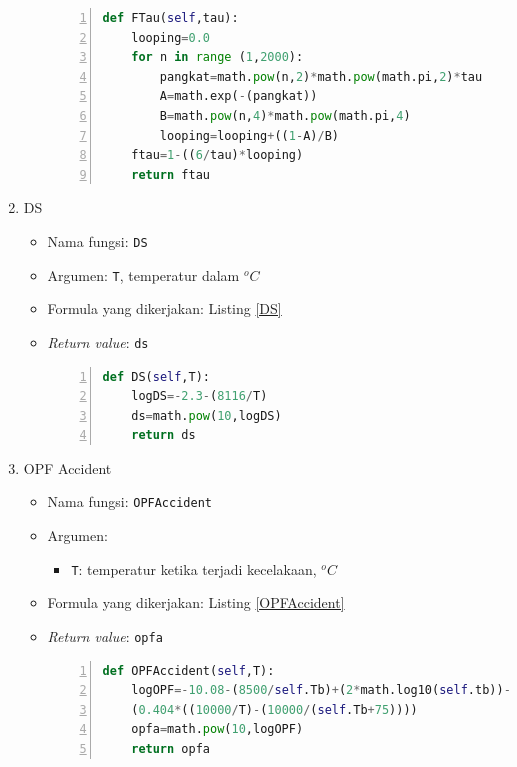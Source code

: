 \documentclass[a4paper,11pt]{report}
\begin{document}
\begin{enumerate}
\begin{itemize}
\scriptsize
\begin{lstlisting}[language=python, numbers=left, numberstyle=\tiny, caption=Fungsi FTau, showstringspaces=false, label=FTau]    
def FTau(self,tau):
	looping=0.0
	for n in range (1,2000):
		pangkat=math.pow(n,2)*math.pow(math.pi,2)*tau
		A=math.exp(-(pangkat))
		B=math.pow(n,4)*math.pow(math.pi,4)
		looping=looping+((1-A)/B)			
	ftau=1-((6/tau)*looping)
	return ftau
\end{lstlisting}
\normalsize
    
  \end{itemize}
  \item DS
  \begin{itemize}
    \item Nama fungsi: \texttt{DS}
    \item Argumen: \texttt{T}, temperatur dalam $^{o}C$
    \item Formula yang dikerjakan: Listing \ref{DS}
    \item \textit{Return value}: \texttt{ds}
    
\scriptsize
\begin{lstlisting}[language=python, numbers=left, numberstyle=\tiny, caption=Fungsi DS, showstringspaces=false, label=DS]
def DS(self,T):
	logDS=-2.3-(8116/T)
	ds=math.pow(10,logDS)
	return ds
\end{lstlisting}
\normalsize

  \end{itemize}
  \item OPF Accident
  \begin{itemize}
    \item Nama fungsi: \texttt{OPFAccident}
    \item Argumen:
    \begin{itemize}
      \item \texttt{T}: temperatur ketika terjadi kecelakaan, $^{o}C$
    \end{itemize}
    \item Formula yang dikerjakan: Listing \ref{OPFAccident}
    \item \textit{Return value}: \texttt{opfa}
    
\scriptsize
\begin{lstlisting}[language=python, numbers=left, numberstyle=\tiny, caption=Fungsi OPFAccident, showstringspaces=false, label=OPFAccident]
def OPFAccident(self,T):	
	logOPF=-10.08-(8500/self.Tb)+(2*math.log10(self.tb))-
	(0.404*((10000/T)-(10000/(self.Tb+75))))
	opfa=math.pow(10,logOPF)
	return opfa
\end{lstlisting}
\normalsize
  \end{itemize}


\end{enumerate}
\end{document}

